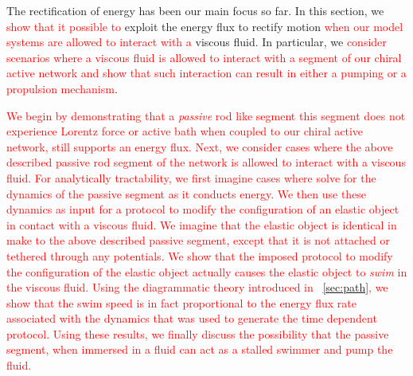\documentclass[
 preprint,
 preprintnumbers,
 amsmath,amssymb,
 aps,
 pre,
 longbibliography,
 superscriptaddress,
 10pt, twocolumn
]{revtex4-1}
\begin{document}


The rectification of energy has been our main focus so far. In this section, we \textcolor{red}{show that it possible to} exploit the energy flux to rectify motion \textcolor{red}{when our model systems are allowed to interact with a } viscous fluid.
In particular, we \textcolor{red}{consider scenarios where a viscous fluid is allowed to interact with a segment of our chiral active network and show that such interaction can result in either a pumping or a propulsion mechanism}.
 
\textcolor{red}{We begin by demonstrating that a {\it passive} rod like segment \textendash this segment does not experience Lorentz force or active bath \textendash when coupled to our chiral active network, still supports an energy flux. Next, we consider cases where the above described passive rod segment  of the network is allowed to interact with a viscous fluid. For analytically tractability, we first imagine cases where solve for the dynamics of the passive segment as it conducts energy. We then use these dynamics as input for a protocol to modify the configuration of an elastic object in contact with a viscous fluid. We imagine that the elastic object is identical in make to the above described passive segment, except that it is not attached or tethered through any potentials. We show that the imposed protocol to modify the configuration of the elastic object actually causes the elastic object to {\it swim} in the viscous fluid. Using the diagrammatic theory introduced in \secname~\ref{sec:path}, we show that the swim speed is in fact proportional to the energy flux rate associated with the dynamics that was used to generate the time dependent protocol. Using these results, we finally discuss the possibility that the passive segment, when immersed in a fluid can act as a stalled swimmer and pump the fluid.}

\end{document}
